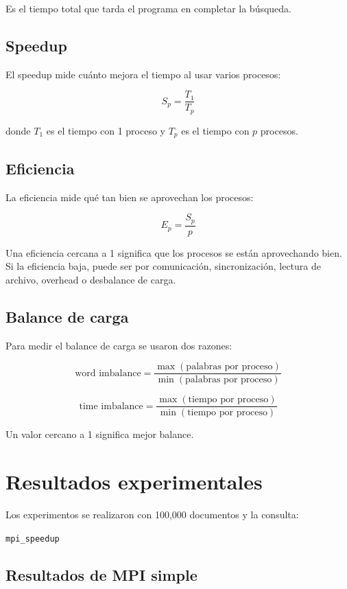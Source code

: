 \documentclass[12pt,letterpaper]{article}
\begin{document}
Es el tiempo total que tarda el programa en completar la búsqueda.

\subsection{Speedup}

El speedup mide cuánto mejora el tiempo al usar varios procesos:

\[
S_p = \frac{T_1}{T_p}
\]

donde $T_1$ es el tiempo con 1 proceso y $T_p$ es el tiempo con $p$ procesos.

\subsection{Eficiencia}

La eficiencia mide qué tan bien se aprovechan los procesos:

\[
E_p = \frac{S_p}{p}
\]

Una eficiencia cercana a 1 significa que los procesos se están aprovechando bien. Si la eficiencia baja, puede ser por comunicación, sincronización, lectura de archivo, overhead o desbalance de carga.

\subsection{Balance de carga}

Para medir el balance de carga se usaron dos razones:

\[
\text{word imbalance} =
\frac{\max(\text{palabras por proceso})}
{\min(\text{palabras por proceso})}
\]

\[
\text{time imbalance} =
\frac{\max(\text{tiempo por proceso})}
{\min(\text{tiempo por proceso})}
\]

Un valor cercano a 1 significa mejor balance.

\section{Resultados experimentales}

Los experimentos se realizaron con 100,000 documentos y la consulta:

\begin{center}
\texttt{mpi\_speedup}
\end{center}

\subsection{Resultados de MPI simple}
\end{document}
